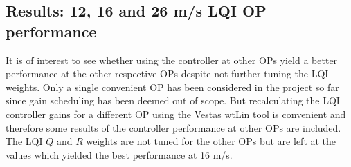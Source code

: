\clearpage
\subsection{Results: 12, 16 and 26 m/s LQI OP performance} \label{sec:test_vts_part2}
It is of interest to see whether using the controller at other OPs yield a better performance at the other respective OPs despite not further tuning the LQI weights. Only a single convenient OP has been considered in the project so far since gain scheduling has been deemed out of scope. But recalculating the LQI controller gains for a different OP using the Vestas wtLin tool is convenient and therefore some results of the controller performance at other OPs are included. The LQI $ Q $ and $ R $ weights are not tuned for the other OPs but are left at the values which yielded the best performance at 16 m/s.

